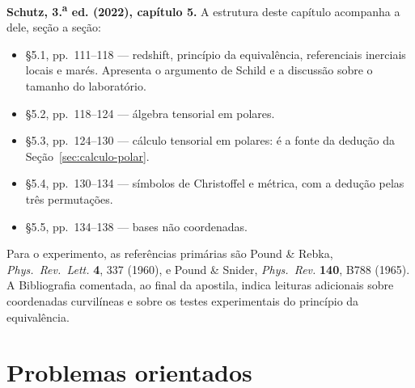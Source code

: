 \documentclass[12pt,a4paper,oneside]{book}
\theoremstyle{rgplain}
\theoremstyle{rgremark}
\begin{document}
\begin{leitura}
\textbf{Schutz, 3.\textsuperscript{a} ed. (2022), capítulo 5.} A estrutura
deste capítulo acompanha a dele, seção a seção:
\begin{itemize}
  \item \S5.1, pp.~111--118 --- redshift, princípio da equivalência,
  referenciais inerciais locais e marés. Apresenta o argumento de Schild e a
  discussão sobre o tamanho do laboratório.
  \item \S5.2, pp.~118--124 --- álgebra tensorial em polares.
  \item \S5.3, pp.~124--130 --- cálculo tensorial em polares: é a fonte da
  dedução da Seção~\ref{sec:calculo-polar}.
  \item \S5.4, pp.~130--134 --- símbolos de Christoffel e métrica, com a
  dedução pelas três permutações.
  \item \S5.5, pp.~134--138 --- bases não coordenadas.
\end{itemize}
Para o experimento, as referências primárias são Pound \& Rebka,
\emph{Phys.\ Rev.\ Lett.} \textbf{4}, 337 (1960), e Pound \& Snider,
\emph{Phys.\ Rev.} \textbf{140}, B788 (1965). A Bibliografia comentada, ao
final da apostila, indica leituras adicionais sobre coordenadas curvilíneas e
sobre os testes experimentais do princípio da equivalência.
\end{leitura}

\section{Problemas orientados}
\end{document}

